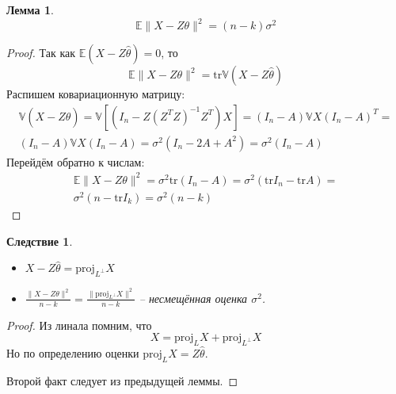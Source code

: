 \documentclass[a4paper,12pt]{article}
\theoremstyle{plain}
\newtheorem{lemma}{Лемма}[section]
\newtheorem*{corollary}{Следствие}
\theoremstyle{definition}
\theoremstyle{remark}
\begin{document}
\begin{lemma}
  \[
    \mathbb{E}\|X - Z\theta\|^2 = (n - k)\sigma^2
  \]
\end{lemma}

\begin{proof}
  Так как $\mathbb{E}(X - Z\hat{\theta}) = 0$, то
  \[
    \mathbb{E}\|X - Z\theta\|^2 = \text{tr}\mathbb{V}(X - Z\hat{\theta})
  \]
  Распишем ковариационную матрицу:
  \begin{align*}
    \mathbb{V}(X - Z\hat{\theta}) = \mathbb{V}[(I_n - Z(Z^TZ)^{-1}Z^T)X]=(I_n - A)\mathbb{V}X(I_n - A)^T =\\
    (I_n - A)\mathbb{V}X(I_n - A) = \sigma^2(I_n - 2A + A^2) = \sigma^2(I_n - A)
  \end{align*}
  Перейдём обратно к числам:
  \begin{align*}
    \mathbb{E}\|X - Z\theta\|^2 = \sigma^2\text{tr}(I_n - A) = \sigma^2(\text{tr}I_n - \text{tr}A) =\\
    \sigma^2(n -  \text{tr}I_k) = \sigma^2(n - k)
  \end{align*}
\end{proof}

\begin{corollary}
  \begin{itemize}
    \item $X - Z\hat{\theta} = \text{proj}_{L^\bot}X$
    \item $\frac{\|X - Z\theta\|^2}{n - k} = \frac{\|\text{proj}_{L^\bot}X\|^2}{n - k}$ -- несмещённая оценка $\sigma^2$.
  \end{itemize}
\end{corollary}

\begin{proof}
  Из линала помним, что
  \[
    X = \text{proj}_LX + \text{proj}_{L^\bot}X
  \]
  Но по определению оценки $\text{proj}_LX = Z\hat{\theta}$.

  Второй факт следует из предыдущей леммы.
\end{proof}
\end{document}
